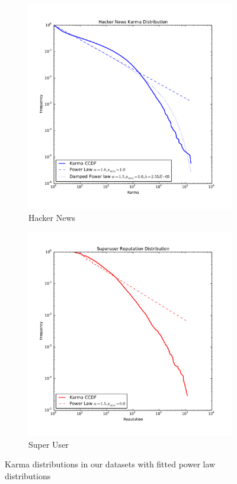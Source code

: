 \documentclass[10pt]{article}
\begin{document}
\begin{figure}[h]
\centering
\begin{subfigure}{0.49\textwidth}
\centering
\includegraphics[width=\linewidth]{hn_karma_distribution}
\caption{Hacker News}
\label{fig:hnkarma}
\end{subfigure}%
\begin{subfigure}{0.49\textwidth}
\centering
\includegraphics[width=\linewidth]{su_karma_distribution}
\caption{Super User}
\label{fig:sukarma}
\end{subfigure}
\caption{Karma distributions in our datasets with fitted power law distributions}
\label{fig:karma}
\end{figure}
\end{document}
